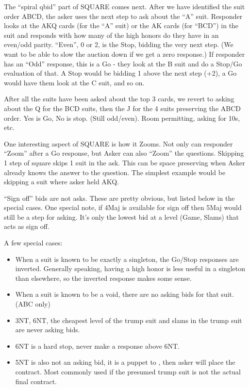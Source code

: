 \documentclass[tom-ari]{subfile}
\begin{document}
The ``spiral qbid'' part of SQUARE comes next.  After we have identified the suit order ABCD, the asker uses the next step to ask about the ``A'' suit.  Responder looks at the AKQ cards (for the ``A'' suit) or the AK cards (for ``BCD'') in the suit and responds with how many of the high honors do they have in an even/odd parity.  ``Even'', 0 or 2, is the Stop, bidding the very next step.  (We want to be able to slow the auction down if we get a zero response.)  If responder has an ``Odd'' response, this is a Go - they look at the B suit and do a Stop/Go evaluation of that.  A Stop would be bidding 1 above the next step (+2), a Go would have them look at the C suit, and so on.

After all the suits have been asked about the top 3 cards, we revert to asking about the Q for the BCD suits, then the J for the 4 suits preserving the ABCD order.  Yes is Go, No is stop.  (Still odd/even).  Room permitting, asking for 10s, etc.

One interesting aspect of SQUARE is how it Zooms.  Not only can responder ``Zoom'' after a Go response, but Asker can also ``Zoom'' the questions.  Skipping 1 step of square skips 1 suit in the ask.  This can be space preserving when Asker already knows the answer to the question.  The simplest example would be skipping a suit where asker held AKQ.

``Sign off'' bids are not asks. These are pretty obvious, but listed below in the special cases.  One special note, if 4Maj is available for sign off then 5Maj would still be a step for asking.  It's only the lowest bid at a level (Game, Slams) that acts as sign off.

A few special cases:  

\begin{itemize}
	\item When a suit is known to be exactly a singleton, the Go/Stop responses are inverted.  Generally speaking, having a high honor is less useful in a singleton than elsewhere, so the inverted response makes some sense. 
	\item When a suit is known to be a void, there are no asking bids for that suit. (ABC only)
	\item 3NT, 6NT, the cheapest level of the trump suit and slams in the trump suit are never asking bids.
	\item 6NT is a hard stop, never make a response above 6NT.  
	\item 5NT is also not an asking bid, it is a puppet to , then asker will place the contract.  Most commonly used if the presumed trump suit is not the actual final contract.
\end{itemize}
\end{document}
